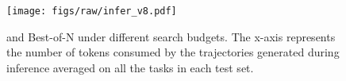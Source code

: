 \begin{figure}[tb]
    \centering
    \texttt{[image: figs/raw/infer\_v8.pdf]}
        \vspace{-20pt}
        \caption{{\ours} and Best-of-N under different search budgets. The x-axis represents the number of tokens consumed by the trajectories generated during inference averaged on all the tasks in each test set.}
        \label{fig:infer_curve}
        \vspace{-22pt}
\end{figure}